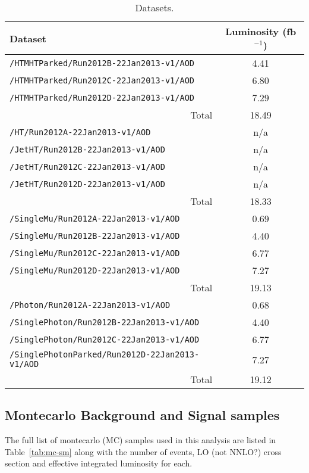 \begin{table}[ht]
  \caption{Datasets.}
  \label{tab:datasets}
  \centering
  \scriptsize
  \begin{tabular}{ lc }
    \hline
    \hline
    Dataset & Luminosity (fb$^{-1}$) \\
    \hline
    \verb!/HTMHTParked/Run2012B-22Jan2013-v1/AOD! & 4.41 \\
    \verb!/HTMHTParked/Run2012C-22Jan2013-v1/AOD! & 6.80 \\
    \verb!/HTMHTParked/Run2012D-22Jan2013-v1/AOD! & 7.29 \\
    \multicolumn{1}{r}{Total} & 18.49 \\ [0.5ex]
    \verb!/HT/Run2012A-22Jan2013-v1/AOD! & n/a \\
    \verb!/JetHT/Run2012B-22Jan2013-v1/AOD! & n/a \\
    \verb!/JetHT/Run2012C-22Jan2013-v1/AOD! & n/a \\
    \verb!/JetHT/Run2012D-22Jan2013-v1/AOD! & n/a \\
    \multicolumn{1}{r}{Total} & 18.33 \\ [0.5ex]
    \verb!/SingleMu/Run2012A-22Jan2013-v1/AOD! & 0.69 \\
    \verb!/SingleMu/Run2012B-22Jan2013-v1/AOD! & 4.40 \\
    \verb!/SingleMu/Run2012C-22Jan2013-v1/AOD! & 6.77 \\
    \verb!/SingleMu/Run2012D-22Jan2013-v1/AOD! & 7.27 \\
    \multicolumn{1}{r}{Total} & 19.13 \\ [0.5ex] %
    \verb!/Photon/Run2012A-22Jan2013-v1/AOD! & 0.68 \\
    \verb!/SinglePhoton/Run2012B-22Jan2013-v1/AOD! & 4.40 \\
    \verb!/SinglePhoton/Run2012C-22Jan2013-v1/AOD! & 6.77 \\
    \verb!/SinglePhotonParked/Run2012D-22Jan2013-v1/AOD! & 7.27 \\
    \multicolumn{1}{r}{Total} & 19.12 \\ [0.5ex] %
    \hline
    \hline
  \end{tabular}
\end{table}

\subsection{Montecarlo Background and Signal samples}

The full list of montecarlo (MC) samples used in this analysis are listed in 
Table~\ref{tab:mc-sm} along with the number of events, LO (not NNLO?) cross 
section and effective integrated luminosity for each.

